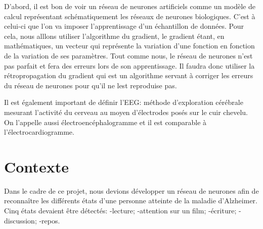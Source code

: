 	D'abord, il est bon de voir un réseau de neurones artificiels comme un modèle de calcul représentant schématiquement les réseaux de neurones biologiques. C'est à celui-ci que l'on va imposer l'apprentissage d'un échantillon de données. Pour cela, nous alllons utiliser l'algorithme du gradient, le gradient étant, en mathématiques, un vecteur qui représente la variation d'une fonction en fonction de la variation de ses paramètres. Tout comme nous, le réseau de neurones n'est pas parfait et fera des erreurs lors de son apprentissage. Il faudra donc utiliser la rétropropagation du gradient qui est un algorithme servant à corriger les erreurs du réseau de neurones pour qu'il ne lest reproduise pas.
	
	Il est également important de définir l'EEG: méthode d'exploration cérébrale mesurant l'activité du cerveau au moyen d'électrodes posés sur le cuir chevelu. On l'appelle aussi électroencéphalogramme et il est comparable à l'électrocardiogramme.
	

	\section{Contexte} %
	\label{sec:contexte}
	
	   Dans le cadre de ce projet, nous devions développer un réseau de neurones afin de reconnaître les différents états d'une personne atteinte de la maladie d'Alzheimer. Cinq états devaient être détectés:
	-lecture;
	-attention sur un film;
	-écriture;
	-discussion;
	-repos.
	
	
	

